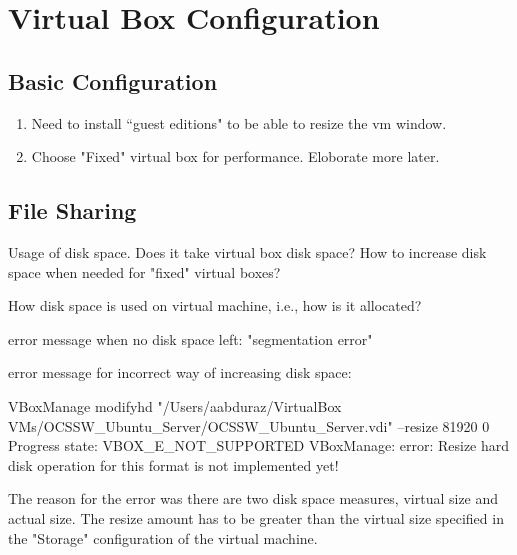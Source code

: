 \documentclass[11pt, oneside]{article}   	%
\begin{document}
\section{\color{DarkGreen}Virtual Box Configuration}

\subsection{Basic Configuration}
\begin{enumerate}
\item Need to install ``guest editions" to be able to resize the vm window.
\item Choose "Fixed" virtual box for performance. Eloborate more later.
\end{enumerate}

\subsection{File Sharing}

Usage of disk space. Does it take virtual box disk space? How to increase disk space when needed for "fixed" virtual boxes?

How disk space is used on virtual machine, i.e., how is it allocated?

error message when no disk space left:
"segmentation error"

error message for incorrect way of increasing disk space:

VBoxManage modifyhd "/Users/aabduraz/VirtualBox VMs/OCSSW_Ubuntu_Server/OCSSW_Ubuntu_Server.vdi" --resize 81920
0%
Progress state: VBOX_E_NOT_SUPPORTED
VBoxManage: error: Resize hard disk operation for this format is not implemented yet!

The reason for the error was there are two disk space measures, virtual size and actual size. The resize amount has to be greater than the virtual size specified in the "Storage" configuration of the virtual machine.
\end{document}
